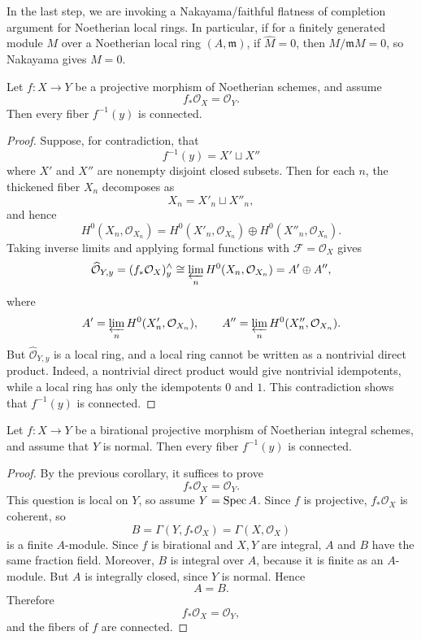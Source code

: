 \documentclass[12pt]{article}
\begin{document}
In the last step, we are invoking a Nakayama/faithful flatness of completion argument for Noetherian local rings. In particular, if for a finitely generated module $M$ over a Noetherian local ring $(A,\mathfrak m)$, if $\widehat M=0$, then $M/\mathfrak m M=0$, so Nakayama gives $M=0$.

\begin{corollary}
    Let $f:X\to Y$ be a projective morphism of Noetherian schemes, and assume
    \[
        f_*\mathcal O_X=\mathcal O_Y.
    \]
    Then every fiber $f^{-1}(y)$ is connected.
\end{corollary}

\begin{proof}
    Suppose, for contradiction, that
    \[
        f^{-1}(y)=X'\sqcup X''
    \]
    where $X'$ and $X''$ are nonempty disjoint closed subsets. Then for each $n$, the thickened fiber $X_n$ decomposes as
    \[
        X_n=X'_n\sqcup X''_n,
    \]
    and hence
    \[
        H^0(X_n,\mathcal O_{X_n})
        =
        H^0(X'_n,\mathcal O_{X_n})
        \oplus
        H^0(X''_n,\mathcal O_{X_n}).
    \]
    Taking inverse limits and applying formal functions with $\mathcal F=\mathcal O_X$ gives
    \[
        \widehat{\mathcal O}_{Y,y}
        =
        (f_*\mathcal O_X)^\wedge_y
        \cong
        \varprojlim_n H^0(X_n,\mathcal O_{X_n})
        =
        A'\oplus A'',
    \]
    where
    \[
        A'=\varprojlim_n H^0(X'_n,\mathcal O_{X_n}),
        \qquad
        A''=\varprojlim_n H^0(X''_n,\mathcal O_{X_n}).
    \]
    But $\widehat{\mathcal O}_{Y,y}$ is a local ring, and a local ring cannot be written as a nontrivial direct product. Indeed, a nontrivial direct product would give nontrivial idempotents, while a local ring has only the idempotents $0$ and $1$. This contradiction shows that $f^{-1}(y)$ is connected.
\end{proof}

\begin{corollary}
    Let $f:X\to Y$ be a birational projective morphism of Noetherian integral schemes, and assume that $Y$ is normal. Then every fiber $f^{-1}(y)$ is connected.
\end{corollary}

\begin{proof}
    By the previous corollary, it suffices to prove
    \[
        f_*\mathcal O_X=\mathcal O_Y.
    \]
    This question is local on $Y$, so assume $Y=\operatorname{Spec} A$. Since $f$ is projective, $f_*\mathcal O_X$ is coherent, so
    \[
        B=\Gamma(Y,f_*\mathcal O_X)=\Gamma(X,\mathcal O_X)
    \]
    is a finite $A$-module. Since $f$ is birational and $X,Y$ are integral, $A$ and $B$ have the same fraction field. Moreover, $B$ is integral over $A$, because it is finite as an $A$-module. But $A$ is integrally closed, since $Y$ is normal. Hence
    \[
        A=B.
    \]
    Therefore
    \[
        f_*\mathcal O_X=\mathcal O_Y,
    \]
    and the fibers of $f$ are connected.
\end{proof}
\end{document}
